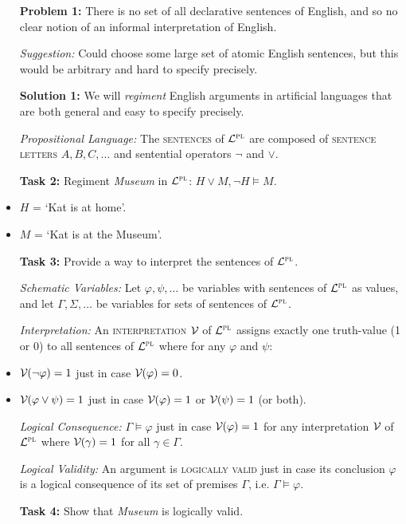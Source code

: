 \documentclass[a4paper, 11pt]{article} %
\begin{document}
\begin{itemize}[leftmargin=1in,labelsep=.15in]
  \item[\bf Problem 1:] There is no set of all declarative sentences of English, and so no clear notion of an informal interpretation of English.
  \item[\it Suggestion:] Could choose some large set of atomic English sentences, but this would be arbitrary and hard to specify precisely.
  \item[\bf Solution 1:] We will \textit{regiment} English arguments in artificial languages that are both general and easy to specify precisely.
  \item[\it Propositional Language:] The \textsc{sentences} of $\mathcal{L}^{\textsc{pl}}$ are composed of \textsc{sentence letters} $A, B, C, \ldots$ and sentential operators $\neg$ and $\vee$.
  \item[\bf Task 2:] Regiment \textit{Museum} in $\mathcal{L}^{\textsc{pl}}$: $H\vee M, \neg H \vDash M$.
    \item $H$ = `Kat is at home'. 
    \item $M$ = `Kat is at the Museum'. 
  \item[\bf Task 3:] Provide a way to interpret the sentences of $\mathcal{L}^{\textsc{pl}}$.
  \item[\it Schematic Variables:] Let $\varphi, \psi, \ldots$ be variables with sentences of $\mathcal{L}^{\textsc{pl}}$ as values, and let $\Gamma, \Sigma, \ldots$ be variables for sets of sentences of $\mathcal{L}^{\textsc{pl}}$. 
  \item[\it Interpretation:] An \textsc{interpretation} $\mathcal{V}_{}$ of $\mathcal{L}^{\textsc{pl}}$ assigns exactly one truth-value (1 or 0) to all sentences of $\mathcal{L}^{\textsc{pl}}$ where for any $\varphi$ and $\psi$: 
  \item $\mathcal{V}_{}(\neg\varphi)=1$ just in case $\mathcal{V}_{}(\varphi)=0$.
  \item $\mathcal{V}_{}(\varphi\vee\psi)=1$ just in case $\mathcal{V}_{}(\varphi)=1$ or $\mathcal{V}_{}(\psi)=1$ (or both).
  \item[\it Logical Consequence:] $\Gamma \vDash \varphi$ just in case $\mathcal{V}_{}(\varphi)=1$ for any interpretation $\mathcal{V}_{}$ of $\mathcal{L}^{\textsc{pl}}$ where $\mathcal{V}_{}(\gamma)=1$ for all $\gamma \in \Gamma$.
  \item[\it Logical Validity:] An argument is \textsc{logically valid} just in case its conclusion $\varphi$ is a logical consequence of its set of premises $\Gamma$, i.e. $\Gamma \vDash \varphi$.
  \item[\bf Task 4:] Show that \textit{Museum} is logically valid.
\end{itemize}
\end{document}

